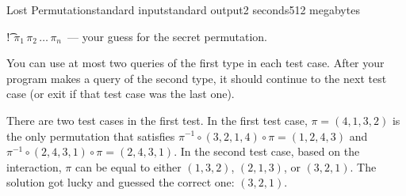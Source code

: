 \begin{problem}{Lost Permutation}{standard input}{standard output}{2 seconds}{512 megabytes}
\begin{shortitems}
\item \t{! $\pi_1 \, \pi_2 \, \ldots \, \pi_n$}~--- your guess for the secret permutation.
\end{shortitems}
\vspace{-1mm}

You can use at most two queries of the first type in each test case. After your program makes a query of the second type, it should continue to the next test case (or exit if that test case was the last one). 

\Example

\begin{example}
%
\end{example}

\Note
There are two test cases in the first test. In the first test case, $\pi = (4, 1, 3, 2)$ is the only permutation that satisfies $\pi^{-1} \circ (3, 2, 1, 4) \circ \pi = (1, 2, 4, 3)$ and $\pi^{-1} \circ (2, 4, 3, 1) \circ \pi = (2, 4, 3, 1)$. In the second test case, based on the interaction, $\pi$ can be equal to either $(1, 3, 2)$, $(2, 1, 3)$, or $(3, 2, 1)$. The solution got lucky and guessed the correct one: $(3, 2, 1)$.

\end{problem}

